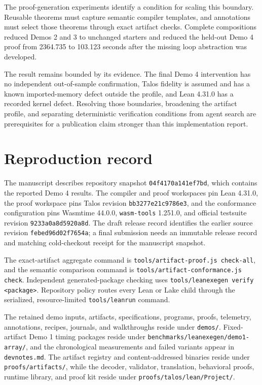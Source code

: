 \documentclass[11pt]{article}
\newcommand{\code}[1]{\texttt{#1}}
\begin{document}
The proof-generation experiments identify a condition for scaling this boundary.  Reusable theorems must capture semantic compiler templates, and annotations must select those theorems through exact artifact checks.  Complete compositions reduced Demos 2 and 3 to unchanged starters and reduced the held-out Demo 4 proof from 2364.735 to 103.123 seconds after the missing loop abstraction was developed.

The result remains bounded by its evidence.  The final Demo 4 intervention has no independent out-of-sample confirmation, Talos fidelity is assumed and has a known imported-memory defect outside the profile, and Lean 4.31.0 has a recorded kernel defect.  Resolving those boundaries, broadening the artifact profile, and separating deterministic verification conditions from agent search are prerequisites for a publication claim stronger than this implementation report.

\appendix
\section{Reproduction record}

The manuscript describes repository snapshot \code{04f4170a141ef7bd}, which contains the reported Demo 4 results.  The compiler and proof workspaces pin Lean 4.31.0, the proof workspace pins Talos revision \code{bb3277e21c9786e3}, and the conformance configuration pins Wasmtime 44.0.0, \code{wasm-tools} 1.251.0, and official testsuite revision \code{9233a0a8d5920a8d}.  The draft release record identifies the earlier source revision \code{febed96d02f7654a}; a final submission needs an immutable release record and matching cold-checkout receipt for the manuscript snapshot.

The exact-artifact aggregate command is \code{tools/artifact-proof.js check-all}, and the semantic comparison command is \code{tools/artifact-conformance.js check}.  Independent generated-package checking uses \code{tools/leanexegen verify <package>}.  Repository policy routes every Lean or Lake child through the serialized, resource-limited \code{tools/leanrun} command.

The retained demo inputs, artifacts, specifications, programs, proofs, telemetry, annotations, recipes, journals, and walkthroughs reside under \code{demos/}.  Fixed-artifact Demo 1 timing packages reside under \code{benchmarks/leanexegen/demo1-array/}, and the chronological measurements and failed variants appear in \code{devnotes.md}.  The artifact registry and content-addressed binaries reside under \code{proofs/artifacts/}, while the decoder, validator, translation, behavioral proofs, runtime library, and proof kit reside under \code{proofs/talos/lean/Project/}.



\end{document}
